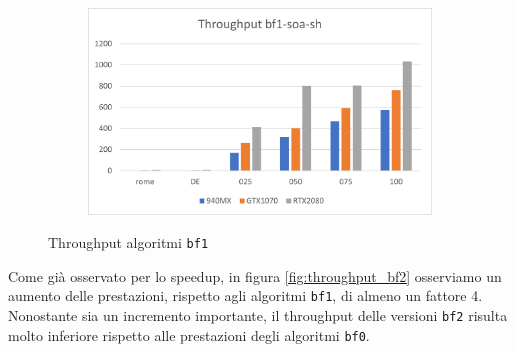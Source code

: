 \documentclass[12pt,a4paper,oneside]{book}
\begin{document}
\begin{figure}[b]
\begin{subfigure}{.5\textwidth}
		\end{subfigure}%
		\begin{subfigure}{.5\textwidth}
			\centering
			\includegraphics[width=\textwidth]{throughput_bf1-soa-sh}
		\end{subfigure}
		\caption{Throughput algoritmi \texttt{bf1}}
		\label{fig:throughput_bf1}
	\end{figure}

	Come già osservato per lo speedup, in figura \ref{fig:throughput_bf2} osserviamo un aumento delle prestazioni, rispetto agli algoritmi \texttt{bf1}, di almeno un fattore 4. Nonostante sia un incremento importante, il throughput delle versioni \texttt{bf2} risulta molto inferiore rispetto alle prestazioni degli algoritmi \texttt{bf0}.
\end{document}
